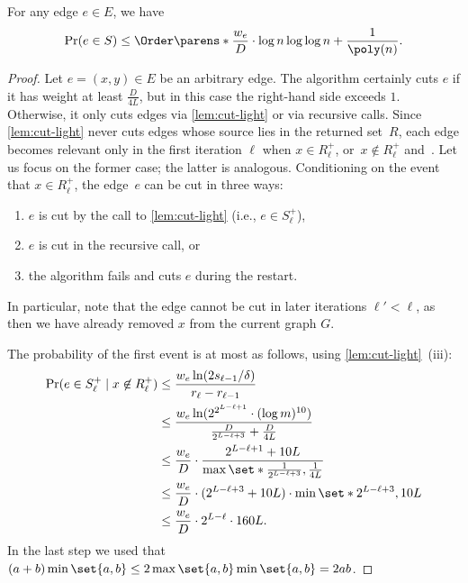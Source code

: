 \begin{lemma} \label{lem:ldd-fast-prob}
For any edge $e \in E$, we have
\begin{equation*}
    \Pr(e \in S) \leq \Order\parens*{\frac{w_e}{D} \cdot \log n \log\log n + \frac{1}{\poly(n)}}.
\end{equation*}
\end{lemma}
\begin{proof}
Let $e = (x, y) \in E$ be an arbitrary edge. The algorithm certainly cuts $e$ if it has weight at least $\frac{D}{4L}$, but in this case the right-hand side exceeds $1$. Otherwise, it only cuts edges via \cref{lem:cut-light} or via recursive calls. Since \cref{lem:cut-light} never cuts edges whose source lies in the returned set~$R$, each edge becomes relevant only in the first iteration $\ell$ when $x \in R_\ell^+$, or~$x \not\in R_\ell^+$ and~. Let us focus on the former case; the latter is analogous. Conditioning on the event that $x \in R_\ell^+$, the edge~$e$ can be cut in three ways:
\begin{enumerate}
    \item $e$ is cut by the call to \cref{lem:cut-light} (i.e., $e \in S^+_\ell$),
    \item $e$ is cut in the recursive call, or
    \item the algorithm fails and cuts $e$ during the restart.
\end{enumerate}
In particular, note that the edge cannot be cut in later iterations $\ell' < \ell$, as then we have already removed $x$ from the current graph $G$.

The probability of the first event is at most as follows, using \cref{lem:cut-light}~(iii):
\begin{align*}
    \Pr(e \in S^+_\ell \mid x \not\in R^+_\ell)
    &\leq \frac{w_e \ln(2s_{\ell-1} / \delta)}{r_\ell - r_{\ell-1}} \\
    &\leq \frac{w_e \ln(2^{2^{L - \ell + 1}} \cdot (\log m)^{10})}{\frac{D}{2^{L-\ell+3}} + \frac{D}{4L}} \\
    &\leq \frac{w_e}{D} \cdot \frac{2^{L - \ell + 1} + 10L}{\max\set*{\frac{1}{2^{L-\ell+3}}, \frac{1}{4L}}} \\
    &\leq \frac{w_e}{D} \cdot (2^{L-\ell+3} + 10L) \cdot \min\set*{2^{L-\ell+3}, 10L} \\
    &\leq \frac{w_e}{D} \cdot 2^{L-\ell} \cdot 160L.
\end{align*}
In the last step we used that $(a + b) \min\set{a, b} \leq 2 \max\set{a, b} \min\set{a, b} = 2ab$.


\end{proof}
